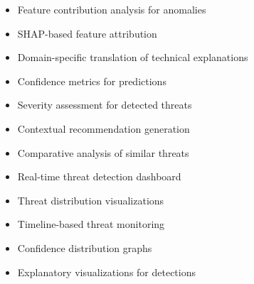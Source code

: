 \documentclass[12pt]{article}
\begin{document}
\begin{itemize}
\item Feature contribution analysis for anomalies
\end{itemize}

\begin{itemize}
\item SHAP-based feature attribution
\end{itemize}

\begin{itemize}
\item Domain-specific translation of technical explanations
\end{itemize}

\begin{itemize}
\item Confidence metrics for predictions
\end{itemize}

\begin{itemize}
\item Severity assessment for detected threats
\end{itemize}

\begin{itemize}
\item Contextual recommendation generation
\end{itemize}

\begin{itemize}
\item Comparative analysis of similar threats
\end{itemize}

\begin{itemize}
\item Real-time threat detection dashboard
\end{itemize}

\begin{itemize}
\item Threat distribution visualizations
\end{itemize}

\begin{itemize}
\item Timeline-based threat monitoring
\end{itemize}

\begin{itemize}
\item Confidence distribution graphs
\end{itemize}

\begin{itemize}
\item Explanatory visualizations for detections
\end{itemize}
\end{document}
